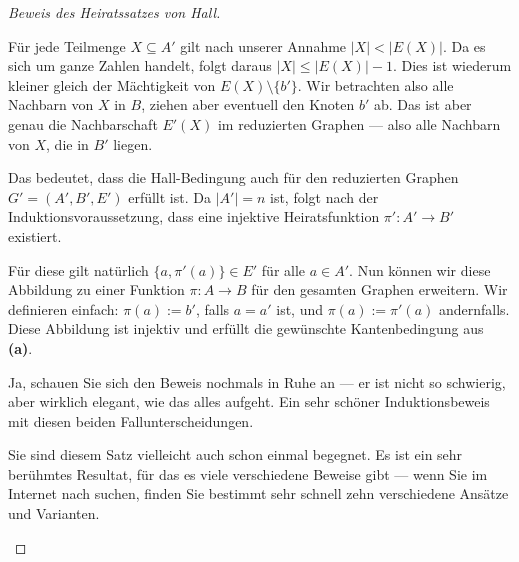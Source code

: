 \begin{proof}[Beweis des Heiratssatzes von Hall]
\begin{spoken-clean}[01:22:50 - 01:24:30]
Für jede Teilmenge $X \subseteq A'$ gilt nach unserer Annahme $|X| < |E(X)|$. Da es sich um ganze Zahlen handelt, folgt daraus $|X| \le |E(X)| - 1$. Dies ist wiederum kleiner gleich der Mächtigkeit von $E(X) \setminus \{b'\}$. Wir betrachten also alle Nachbarn von $X$ in $B$, ziehen aber eventuell den Knoten $b'$ ab. Das ist aber genau die Nachbarschaft $E'(X)$ im reduzierten Graphen --- also alle Nachbarn von $X$, die in $B'$ liegen.
\end{spoken-clean}

\begin{spoken-clean}[01:24:30 - 01:26:00]
Das bedeutet, dass die Hall-Bedingung auch für den reduzierten Graphen $G' = (A', B', E')$ erfüllt ist. Da $|A'| = n$ ist, folgt nach der Induktionsvoraussetzung, dass eine injektive Heiratsfunktion $\pi' \colon A' \to B'$ existiert.
\end{spoken-clean}

\begin{spoken-clean}[01:26:00 - 01:27:20]
Für diese gilt natürlich $\{a, \pi'(a)\} \in E'$ für alle $a \in A'$. Nun können wir diese Abbildung zu einer Funktion $\pi \colon A \to B$ für den gesamten Graphen erweitern. Wir definieren einfach: $\pi(a) := b'$, falls $a = a'$ ist, und $\pi(a) := \pi'(a)$ andernfalls. Diese Abbildung ist injektiv und erfüllt die gewünschte Kantenbedingung aus \textbf{(a)}.
\end{spoken-clean}

\begin{ai-global-state-checkpoint-invisible-content}
\end{ai-global-state-checkpoint-invisible-content}

\begin{spoken-clean}[01:27:20 - 01:28:40]
Ja, schauen Sie sich den Beweis nochmals in Ruhe an --- er ist nicht so schwierig, aber wirklich elegant, wie das alles aufgeht. Ein sehr schöner Induktionsbeweis mit diesen beiden Fallunterscheidungen.

Sie sind diesem Satz vielleicht auch schon einmal begegnet. Es ist ein sehr berühmtes Resultat, für das es viele verschiedene Beweise gibt --- wenn Sie im Internet nach  suchen, finden Sie bestimmt sehr schnell zehn verschiedene Ansätze und Varianten.


\end{spoken-clean}
\end{proof}
